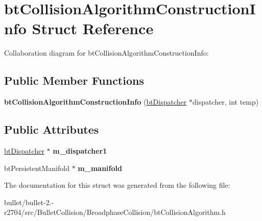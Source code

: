 \hypertarget{structbt_collision_algorithm_construction_info}{\section{bt\+Collision\+Algorithm\+Construction\+Info Struct Reference}
\label{structbt_collision_algorithm_construction_info}
}


Collaboration diagram for bt\+Collision\+Algorithm\+Construction\+Info\+:
\subsection*{Public Member Functions}
\begin{DoxyCompactItemize}
\item 
\hypertarget{structbt_collision_algorithm_construction_info_a41dd8dda48f2e63f219c54ef7e5a3e14}{{\bfseries bt\+Collision\+Algorithm\+Construction\+Info} (\hyperlink{classbt_dispatcher}{bt\+Dispatcher} $\ast$dispatcher, int temp)}\label{structbt_collision_algorithm_construction_info_a41dd8dda48f2e63f219c54ef7e5a3e14}

\end{DoxyCompactItemize}
\subsection*{Public Attributes}
\begin{DoxyCompactItemize}
\item 
\hypertarget{structbt_collision_algorithm_construction_info_a5fa87b86f35c7d0eb047a93f8edaf8a1}{\hyperlink{classbt_dispatcher}{bt\+Dispatcher} $\ast$ {\bfseries m\+\_\+dispatcher1}}\label{structbt_collision_algorithm_construction_info_a5fa87b86f35c7d0eb047a93f8edaf8a1}

\item 
\hypertarget{structbt_collision_algorithm_construction_info_a5069a22af9c06d350a660211321b1475}{bt\+Persistent\+Manifold $\ast$ {\bfseries m\+\_\+manifold}}\label{structbt_collision_algorithm_construction_info_a5069a22af9c06d350a660211321b1475}

\end{DoxyCompactItemize}


The documentation for this struct was generated from the following file\+:\begin{DoxyCompactItemize}
\item 
bullet/bullet-\/2.-\/r2704/src/\+Bullet\+Collision/\+Broadphase\+Collision/bt\+Collision\+Algorithm.\+h\end{DoxyCompactItemize}
